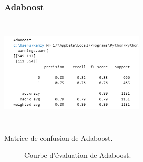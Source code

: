 \subsubsection*{Adaboost}
\begin{minipage}[t]{0.5\textwidth}
    \begin{table}[H]
        \centering
        \setlength{\fboxsep}{5pt}
        \setlength{\fboxrule}{0.5pt}
        \includegraphics[width=7cm,height=5.36cm]{images/Adaboost.png}
        \caption{Matrice de confusion de Adaboost.}
    \end{table}
\end{minipage}
\begin{minipage}[t]{0.5\textwidth}
    \begin{figure}[H]
        \centering
        \setlength{\fboxsep}{5pt}
        \setlength{\fboxrule}{0.5pt}
        \caption{Courbe d'évaluation de Adaboost.}
    \end{figure}
\end{minipage}

